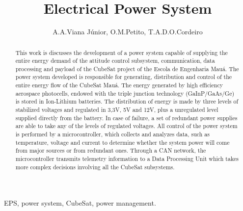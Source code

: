 \documentclass[final,3p,times,twocolumn,authoryear]{elsarticle}
\begin{document}
\begin{frontmatter}


\title{Electrical Power System}

 \author{A.A.Viana J\'{u}nior, O.M.Petito, T.A.D.O.Cordeiro}
 \address{Escola de Engenharia Mauá, São Caetano do Sul, Brasil}
 \address{Escola de Engenharia Mauá, São Caetano do Sul, Brasil}
 \address{Escola de Engenharia Mauá, São Caetano do Sul, Brasil}



\begin{abstract}

	This work is discusses the development of a power system capable of supplying the entire energy demand of the attitude control subsystem, communication, data processing and payload of the CubeSat project of the Escola de Engenharia Mauá. The power system developed is responsible for generating, distribution and control of the entire energy flow of the CubeSat Mauá. The energy generated by high efficiency aerospace photocells, endowed with the triple junction technology (GaInP/GaAs/Ge) is stored in Ion-Lithium batteries. The distribution of energy is made by three levels of stabilized voltages and regulated in 3,3V, 5V and 12V, plus a unregulated level supplied directly from the battery. In case of failure, a set of redundant power supplies are able to take any of the levels of regulated voltages. All control of the power system is performed by a microcontroller, which collects and analyzes data, such as temperature, voltage and current to determine whether the system power will come from major sources or from redundant ones. Through a CAN network, the microcontroller transmits telemetry information to a Data Processing Unit which takes more complex decisions involving all the CubeSat subsystems.

\end{abstract}

\begin{keyword}
 
	EPS, power system, CubeSat, power management.

\end{keyword}

\end{frontmatter}
\end{document}
